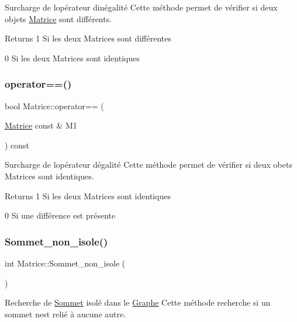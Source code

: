 Surcharge de l\textquotesingle{}op\'{e}rateur d\textquotesingle{}in\'{e}galit\'{e} Cette m\'{e}thode permet de v\'{e}rifier si deux objets \hyperlink{classMatrice}{Matrice} sont diff\'{e}rents. 

\begin{DoxyReturn}{Returns}
1 Si les deux Matrices sont diff\'{e}rentes 

0 Si les deux Matrices sont identiques 
\end{DoxyReturn}
\mbox{\label{classMatrice_a1aceba73ee5c333f0980499245e6b4d3}} 
\subsubsection{\texorpdfstring{operator==()}{operator==()}}
{\footnotesize\ttfamily bool Matrice\+::operator== (\begin{DoxyParamCaption}\item[{\hyperlink{classMatrice}{Matrice} const \&}]{M1 }\end{DoxyParamCaption}) const}



Surcharge de l\textquotesingle{}op\'{e}rateur d\textquotesingle{}\'{e}galit\'{e} Cette m\'{e}thode permet de v\'{e}rifier si deux obets Matrices sont identiques. 

\begin{DoxyReturn}{Returns}
1 Si les deux Matrices sont identiques 

0 Si une diff\'{e}rence est pr\'{e}sente 
\end{DoxyReturn}
\mbox{\label{classMatrice_a20adfc44d75d2292ae49649692cdd0b4}} 
\subsubsection{\texorpdfstring{Sommet\+\_\+non\+\_\+isole()}{Sommet\_non\_isole()}}
{\footnotesize\ttfamily int Matrice\+::\+Sommet\+\_\+non\+\_\+isole (\begin{DoxyParamCaption}{ }\end{DoxyParamCaption})}



Recherche de \hyperlink{classSommet}{Sommet} isol\'{e} dans le \hyperlink{classGraphe}{Graphe} Cette m\'{e}thode recherche si un sommet n\textquotesingle{}est reli\'{e} \`{a} aucune autre. 

